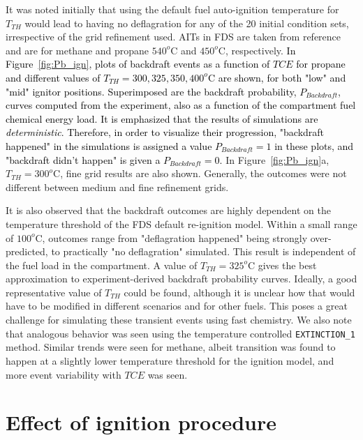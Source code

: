 \documentclass[12pt,letterpaper]{article}
\begin{document}
\begin{flushleft}
It was noted initially that using the default fuel auto-ignition temperature for $T_{TH}$ would lead to having no deflagration for any of the 20 initial condition sets, irrespective of the grid refinement used. AITs in FDS are taken from reference~\cite{SFPE:Beyler} and are for methane and propane $540^o$C and $450^o$C, respectively. 
\textcolor{black}{In Figure~\ref{fig:Pb_ign}, plots of backdraft events as a function of $TCE$ for propane and different values of $T_{TH}=300,325,350,400^o$C are shown, for both "low" and "mid" ignitor positions. Superimposed are the backdraft probability, $P_{Backdraft}$, curves computed from the experiment, also as a function of the compartment fuel chemical energy load. It is emphasized that the results of simulations are \textit{deterministic}. Therefore, in order to visualize their progression, "backdraft happened" in the simulations is assigned a value $P_{Backdraft}=1$ in these plots, and "backdraft didn't happen" is given a $P_{Backdraft}=0$.} In Figure~\ref{fig:Pb_ign}a,  $T_{TH}=300^o$C, fine grid results are also shown. Generally, the outcomes were not different between medium and fine refinement grids.

It is also observed that the backdraft outcomes are highly dependent on the temperature threshold of the FDS default re-ignition model. Within a small range of $100^o$C, outcomes range from "deflagration happened" being strongly over-predicted, to practically "no deflagration" simulated. This result is independent of the fuel load in the compartment. A value of $T_{TH}=325^o$C gives the best approximation to experiment-derived backdraft probability curves. 
Ideally, a good representative value of $T_{TH}$ could be found, although it is unclear how that would have to be modified in different scenarios and for other fuels. This poses a great challenge for simulating these transient events using fast chemistry. We also note that analogous behavior was seen using the temperature controlled \texttt{EXTINCTION\_1} method.
Similar trends were seen for methane, albeit transition was found to happen at a slightly lower temperature threshold for the ignition model, and more event variability with $TCE$ was seen. 

\section{Effect of ignition procedure}
\label{sec:ign_proc}


\end{flushleft}
\end{document}
